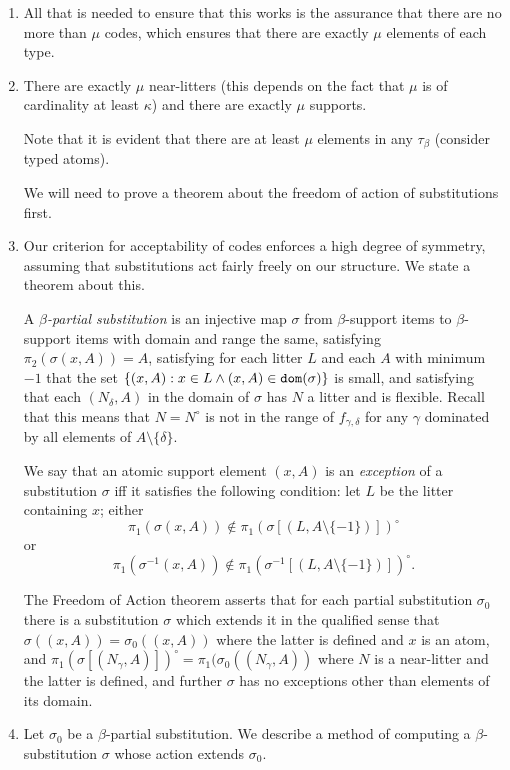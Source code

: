 \documentclass[12pt]{article}
\begin{document}
\begin{enumerate}
\item All that is needed to ensure that this works is the assurance that there are no more than $\mu$ codes, which ensures that there are exactly $\mu$ elements of each type.

\item  There are exactly $\mu$ near-litters (this depends on the fact that $\mu$ is of cardinality at least $\kappa$) and there are exactly $\mu$ supports.

Note that it is evident that there are at least $\mu$ elements in any $\tau_\beta$ (consider typed atoms).

We will need to prove a theorem about the freedom of action of substitutions first.

\item Our criterion for acceptability of codes enforces a high degree of symmetry, assuming that substitutions act fairly freely on our structure.  We state a theorem about this.

A {\em $\beta$-partial substitution\/} is an injective map $\sigma$ from $\beta$-support items to $\beta$-support items with domain and range the same, satisfying $\pi_2(\sigma(x,A)) = A$, satisfying for each litter $L$ and each $A$ with minimum $-1$ that the set $\{(x,A): x \in L \wedge (x,A) \in {\tt dom}(\sigma)\}$ is small, and satisfying that each $(N_\delta,A)$
in the domain of $\sigma$ has $N$ a litter and is flexible.  Recall that this means that $N=N^\circ$ is not in the range of $f_{\gamma,\delta}$ for any $\gamma$ dominated by all elements of $A \setminus \{\delta\}$.

 We say that an atomic support element $(x,A)$ is an {\em exception\/} of a substitution $\sigma$ iff it satisfies the following condition:
let $L$ be the litter containing $x$; either $$\pi_1(\sigma(x,A)) \not\in \pi_1(\sigma[(L,A \setminus \{-1\})])^\circ$$ or $$\pi_1(\sigma^{-1}(x,A)) \not\in \pi_1(\sigma^{-1}[(L,A \setminus \{-1\})])^\circ.$$

The Freedom of Action theorem asserts that for each partial substitution $\sigma_0$  there is a substitution $\sigma$ which extends it in the qualified sense that $\sigma((x,A)) =\sigma_0((x,A))$ where the latter is defined and $x$ is an atom, and $\pi_1(\sigma[(N_\gamma,A)])^\circ = \pi_1(\sigma_0((N_\gamma,A))$ where $N$ is a near-litter and the latter is defined, and further $\sigma$ has no exceptions other than elements of its domain.

\item  Let $\sigma_0$ be a $\beta$-partial substitution.  We describe a method of computing a $\beta$-substitution $\sigma$ whose action extends $\sigma_0$.


\end{enumerate}
\end{document}
